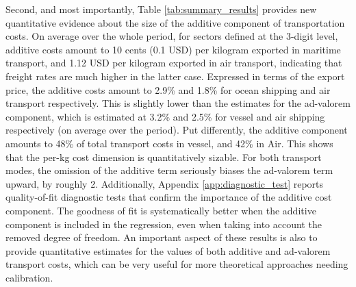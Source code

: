 \documentclass[a4paper,11pt]{article}
\begin{document}
Second, and most importantly, Table \ref{tab:summary_results} provides new quantitative evidence about the size of the additive component of transportation costs.
On average over the whole period, for sectors defined at the 3-digit level, additive costs amount to 10 cents (0.1 USD) per kilogram exported in maritime transport, and 1.12 USD per kilogram exported in air transport, indicating that freight rates are much higher in the latter case.
Expressed in terms of the export price, the additive costs amount to 2.9\% and 1.8\% for ocean shipping and air transport respectively.
This is slightly lower than the estimates for the ad-valorem component, which is estimated at 3.2\% and 2.5\% for vessel and air shipping respectively (on average over the period).
Put differently, the additive component amounts to 48\% of total transport costs in vessel, and 42\% in Air.
This shows that the per-kg cost dimension is quantitatively sizable.
For both transport modes, the omission of the additive term seriously biases the ad-valorem term upward, by roughly 2.
Additionally, Appendix \ref{app:diagnostic_test} reports quality-of-fit diagnostic tests that confirm the importance of the additive cost component.
The goodness of fit is systematically better when the additive component is included in the regression, even when taking into account the removed degree of freedom.
An important aspect of these results is also to provide quantitative estimates for the values of both additive and ad-valorem transport costs, which can be very useful for more theoretical approaches needing calibration.%
\end{document}
